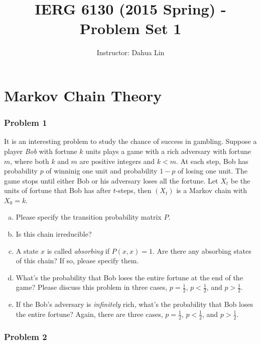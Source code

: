 \documentclass[a4paper,11pt]{article}
\begin{document}
\title{\bf IERG 6130 (2015 Spring) - Problem Set 1}
\author{Instructor: Dahua Lin}
\date{}
\maketitle

\part{Markov Chain Theory}

\section*{Problem 1}

It is an interesting problem to study the chance of success in gambling. Suppose a player \textit{Bob} with fortune $k$ units plays a game with a rich adversary with fortune $m$, where both $k$ and $m$ are positive integers and $k < m$. At each step, Bob has probability $p$ of winninig one unit and probability $1 - p$ of losing one unit. The game stops until either Bob or his adversary loses all the fortune. Let $X_t$ be the units of fortune that Bob has after $t$-steps, then $(X_t)$ is a Markov chain with $X_0 = k$.

\begin{enumerate}[(a)]

\item Please specify the transition probability matrix $P$. 

\item Is this chain irreducible? 

\item A state $x$ is called \textit{absorbing} if $P(x, x) = 1$. Are there any absorbing states of this chain? If so, please specify them.

\item What's the probability that Bob loses the entire fortune at the end of the game? Please discuss this problem in three cases, $p = \frac{1}{2}$, $p < \frac{1}{2}$, and $p > \frac{1}{2}$. 

\item If the Bob's adversary is \textit{infinitely} rich, what's the probability that Bob loses the entire fortune? Again, there are three cases, $p = \frac{1}{2}$, $p < \frac{1}{2}$, and $p > \frac{1}{2}$.  

\end{enumerate}


\section*{Problem 2}
\end{document}
